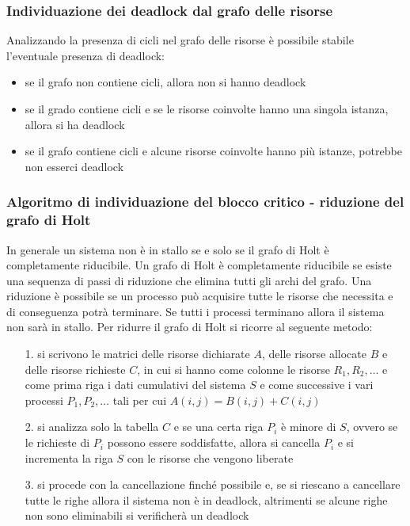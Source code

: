 \documentclass[a4paper]{article}
\begin{document}
\subsubsection*{Individuazione dei deadlock dal grafo delle risorse}
Analizzando la presenza di cicli nel grafo delle risorse è possibile stabile l'eventuale presenza di deadlock:
\begin{itemize}
	\item se il grafo non contiene cicli, allora non si hanno deadlock
	\item se il grado contiene cicli e se le risorse coinvolte hanno una singola istanza, allora si ha deadlock
	\item se il grafo contiene cicli e alcune risorse coinvolte hanno più istanze, potrebbe non esserci deadlock
\end{itemize}

\subsubsection*{Algoritmo di individuazione del blocco critico - riduzione del grafo di Holt}
In generale un sistema non è in stallo se e solo se il grafo di Holt è completamente riducibile. Un grafo di Holt è completamente
riducibile se esiste una sequenza di passi di riduzione che elimina tutti gli archi del grafo. Una riduzione è possibile se un
processo può acquisire tutte le risorse che necessita e di conseguenza potrà terminare. Se tutti i processi terminano allora il
sistema non sarà in stallo. Per ridurre il grafo di Holt si ricorre al seguente metodo:
\begin{itemize}
	\item[1.] si scrivono le matrici delle risorse dichiarate \(A\), delle risorse allocate \(B\) e delle risorse richieste \(C\),
	in cui si hanno come colonne le risorse \(R_1, R_2, \dots\) e come prima riga i dati cumulativi del sistema \(S\) e come
	successive i vari processi \(P_1, P_2, \dots\) tali per cui \(A(i,j) = B(i,j) + C(i,j)\)
	\item[2.] si analizza solo la tabella \(C\) e se una certa riga \(P_i\) è minore di \(S\), ovvero se le richieste di \(P_i\)
	possono essere soddisfatte, allora si cancella \(P_i\) e si incrementa la riga \(S\) con le risorse che vengono liberate
	\item[3.] si procede con la cancellazione finché possibile e, se si riescano a cancellare tutte le righe allora il sistema
	non è in deadlock, altrimenti se alcune righe non sono eliminabili si verificherà un deadlock
\end{itemize}
\end{document}
